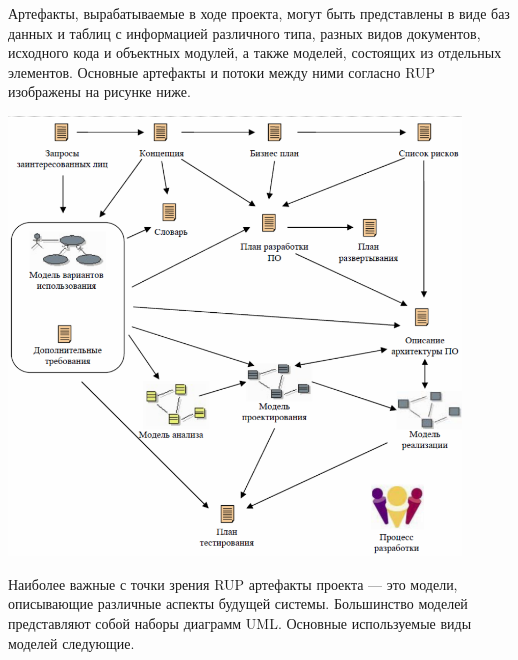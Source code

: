 \documentclass{../../text-style}
\begin{document}
Артефакты, вырабатываемые в ходе проекта, могут быть представлены в виде баз данных и таблиц с информацией различного типа, разных видов документов, исходного кода и объектных модулей, а также моделей, состоящих из отдельных элементов. Основные артефакты и потоки между ними согласно RUP изображены на рисунке ниже.

\begin{center}
    \includegraphics[width=0.9\textwidth]{rupArtefacts.png}
\end{center}

Наиболее важные с точки зрения RUP артефакты проекта --- это модели, описывающие различные аспекты будущей системы. Большинство моделей представляют собой наборы диаграмм UML. Основные используемые виды моделей следующие.
\end{document}
